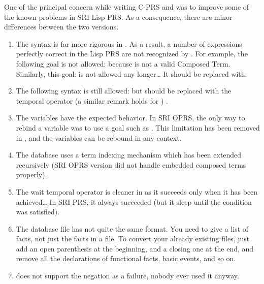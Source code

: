 One of the principal concern while writing C-PRS and \COPRS{} was to
improve some of the known problems in SRI Lisp PRS. As a consequence, there
are minor differences between the two versions.

\begin{enumerate}

\item The syntax is far more rigorous in \COPRS{}. As a result, a
number of expressions perfectly correct in the Lisp PRS are not
recognized by \COPRS{}. For example, the following goal is not allowed: \*
 \*
because \*
 \*
is not a valid Composed Term. Similarly, this goal: \*
 \*
is not allowed any longer\dots{} It should be replaced with: \*

\item The following syntax is still allowed: \*
 \*
but should be replaced with the \code{=>} temporal operator (a similar
remark holds for \code{~>}) .

\item The  variables have the expected behavior. In SRI OPRS, the
only way to rebind a variable was to use a goal such as . This limitation has been removed in \COPRS{}, and the 
variables can be rebound in any context.

\item The database uses a term indexing mechanism which has been extended
recursively (SRI OPRS version did not handle embedded composed terms
properly).

\item The wait temporal operator is cleaner in \COPRS{} as it succeeds only
when it has been achieved\dots{} In SRI PRS, it always succeeded (but it
sleep until the condition was satisfied).

\item The database file has not quite the same format. You need to give a
list of facts, not just the facts in a file. To convert your already
existing files, just add an open parenthesis at the beginning, and a
closing one at the end, and remove all the declarations of functional
facts, basic events, and so on.

\item \COPRS{} does not support the negation as a failure, nobody ever used
it anyway.


\end{enumerate}
